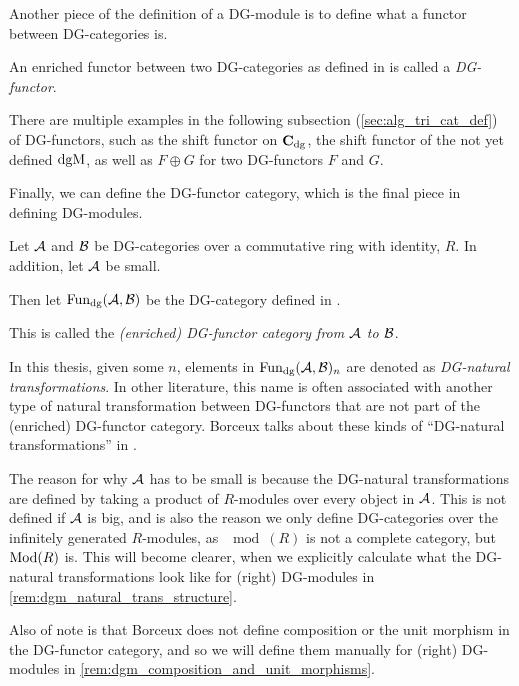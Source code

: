 Another piece of the definition of a DG-module is to define what a functor between DG-categories is.

\begin{definition}[DG-functor]
    An enriched functor between two DG-categories as defined in \cite[Definition 6.2.3]{Borceux_1994} is called a \emph{DG-functor}.
\end{definition}

There are multiple examples in the following subsection (\autoref{sec:alg_tri_cat_def}) of DG-functors, such as the shift functor on \( \operatorname{\mathbf{C}}_{\operatorname{dg}} \), the shift functor of the not yet defined \( \operatorname{dgM} \), as well as \( F \oplus G \) for two DG-functors \( F \) and \( G \).

Finally, we can define the DG-functor category, which is the final piece in defining DG-modules.

\begin{definition}
    \label{def:dg_functor_category}
    Let \( {\mathcal{A}} \) and \( {\mathcal{B}} \) be DG-categories over a commutative ring with identity, \( R \). In addition, let \( {\mathcal{A}} \) be small.

    Then let \( \operatorname{Fun}_{\operatorname{dg}}({\mathcal{A}}, {\mathcal{B}}) \) be the DG-category defined in \cite[Proposition 6.3.1]{Borceux_1994}.

    This is called the \emph{(enriched) DG-functor category from \( {\mathcal{A}} \) to \( {\mathcal{B}} \)}.
\end{definition}

In this thesis, given some \( n \), elements in \( \operatorname{Fun}_{\operatorname{dg}}({\mathcal{A}}, {\mathcal{B}})_n \) are denoted as \emph{DG-natural transformations}. In other literature, this name is often associated with another type of natural transformation between DG-functors that are not part of the (enriched) DG-functor category. Borceux talks about these kinds of ``DG-natural transformations'' in \cite[Definition 6.2.4]{Borceux_1994}.

The reason for why \( {\mathcal{A}} \) has to be small is because the DG-natural transformations are defined by taking a product of \( R \)-modules over every object in \( {\mathcal{A}} \). This is not defined if \( {\mathcal{A}} \) is big, and is also the reason we only define DG-categories over the infinitely generated \( R \)-modules, as \( \mod(R) \) is not a complete category, but \( \operatorname{Mod}(R) \) is. This will become clearer, when we explicitly calculate what the DG-natural transformations look like for (right) DG-modules in \autoref{rem:dgm_natural_trans_structure}.

Also of note is that Borceux does not define composition or the unit morphism in the DG-functor category, and so we will define them manually for (right) DG-modules in \autoref{rem:dgm_composition_and_unit_morphisms}.

